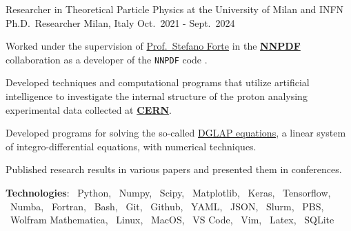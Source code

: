 \begin{cventries}
    \cventry
    {Researcher in Theoretical Particle Physics at the University of Milan and INFN}
    {Ph.D.\ Researcher}
    {Milan, Italy}
    {Oct.\ 2021 - Sept.\ 2024}
    {
        \begin{cvitems} %
            \item Worked under the supervision of \href{https://inspirehep.net/authors/1009661?ui-citation-summary=true}{Prof.\ Stefano Forte} in the \href{https://nnpdf.mi.infn.it}{\textbf{NNPDF}} collaboration 
            as a developer of the \texttt{NNPDF} code \href{https://github.com/NNPDF}{\githublogo}.
            \item Developed techniques and computational programs that utilize artificial intelligence to 
            investigate the internal structure of the proton analysing experimental data collected at \href{https://home.cern}{\textbf{CERN}}.
            \item Developed programs for solving the so-called \href{https://eko.readthedocs.io/en/latest/theory/DGLAP.html}{DGLAP equations}, a linear system of integro-differential equations, with numerical techniques.
            \item Published research results in various papers and presented them in conferences.
            \item[] \textbf{\textcolor{awesome-red}{Tec}hnologies}: \pythonlogo{}~Python, \numpylogo{}~Numpy, \scipylogo{}~Scipy, \matplotliblogo{}~Matplotlib{}, \keraslogo{}~Keras, \tensorflowlogo{}~Tensorflow, \numbalogo{}~Numba, \fortranlogo{}~Fortran, \bashlogo{}~Bash, \gitlogo{}~Git, \githublogo{}~Github, \yamllogo{}~YAML, \jsonlogo{}~JSON, \slurmlogo{}~Slurm, \pbslogo{}~PBS, \mathematicalogo{}~Wolfram Mathematica, \linuxlogo{}~Linux, \faApple{}~MacOS, \vscodelogo{}~VS Code, \vimlogo{}~Vim, \latexlogo{}~Latex, \sqlitelogo{}~SQLite
        \end{cvitems}
    }



\end{cventries}
